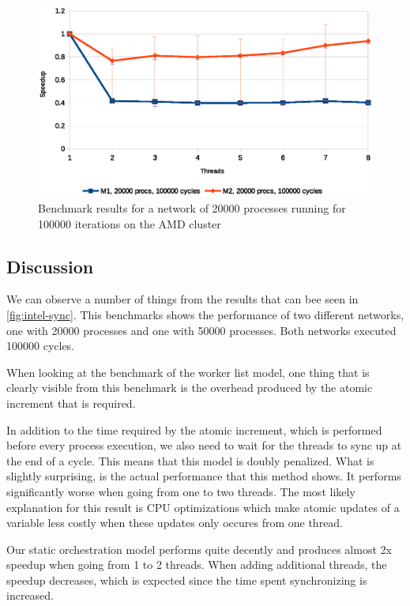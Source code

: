 \begin{figure}
\centering
\includegraphics[width=\textwidth]{graphs/amd-sync}
\caption[Synchronization-dominated benchmark on AMD cluster]{Benchmark results for a network of 20000 processes running
for 100000 iterations on the AMD cluster}
\label{fig:amd-sync}
\end{figure}


\subsection{Discussion}
We can observe a number of things from the results that can bee seen
in \cref{fig:intel-sync}.  This benchmarks shows the performance of
two different networks, one with 20000 processes and one with 50000
processes. Both networks executed 100000 cycles.

When looking at the benchmark of the worker list model, one thing that
is clearly visible from this benchmark is the overhead produced by the
atomic increment that is required. 

In addition to the time required by the atomic increment, which is
performed before every process execution, we also need to wait for the
threads to sync up at the end of a cycle. This means that this model
is doubly penalized. What is slightly surprising, is the actual
performance that this method shows. It performs significantly worse
when going from one to two threads. The most likely explanation for
this result is CPU optimizations which make atomic updates of a
variable less costly when these updates only occures from one thread.

Our static orchestration model performs quite decently and produces
almost 2x speedup when going from 1 to 2 threads. When adding
additional threads, the speedup decreases, which is expected since the
time spent synchronizing is increased.

